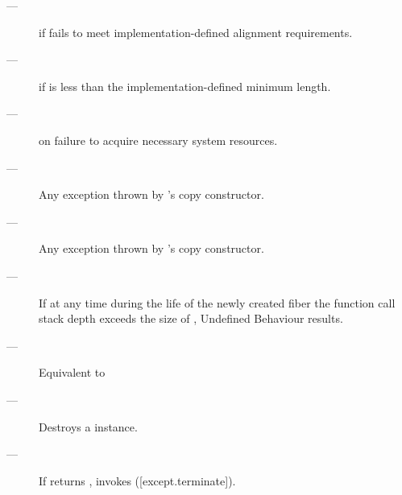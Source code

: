 \except
\begin{description}
    \item[---]  if  fails to meet
               implementation-defined alignment requirements.
    \item[---]  if  is less than the
               implementation-defined minimum length.
    \item[---]  on failure to acquire necessary system
               resources.
    \item[---] Any exception thrown by 's copy constructor.
    \item[---] Any exception thrown by 's copy constructor.
\end{description}

\remarks
\begin{description}
    \item[---] If at any time during the life of the newly created fiber the
          function call stack depth exceeds the size of , Undefined
          Behaviour results.
\end{description}


\begin{description}
    \item[---] Equivalent to 
\end{description}


\effects
\begin{description}
    \item[---] Destroys a \fiber instance.
    \item[---] If \emptyfn returns \false, invokes  ([except.terminate]).
\end{description}



